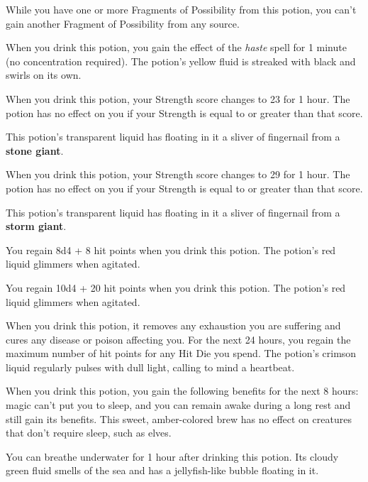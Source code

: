 \documentclass[10pt,a4paper,twoside,bg=print,twocolumn,openany,nodeprecatedcode]{dndbook}
\begin{document}
While you have one or more Fragments of Possibility from this potion, you can't gain another Fragment of Possibility from any source.

When you drink this potion, you gain the effect of the \textit{haste} spell for 1 minute (no concentration required). The potion's yellow fluid is streaked with black and swirls on its own.

When you drink this potion, your Strength score changes to 23 for 1 hour. The potion has no effect on you if your Strength is equal to or greater than that score.

This potion's transparent liquid has floating in it a sliver of fingernail from a \textbf{stone giant}.

When you drink this potion, your Strength score changes to 29 for 1 hour. The potion has no effect on you if your Strength is equal to or greater than that score.

This potion's transparent liquid has floating in it a sliver of fingernail from a \textbf{storm giant}.

You regain 8d4 + 8 hit points when you drink this potion. The potion's red liquid glimmers when agitated.

You regain 10d4 + 20 hit points when you drink this potion. The potion's red liquid glimmers when agitated.

When you drink this potion, it removes any exhaustion you are suffering and cures any disease or poison affecting you. For the next 24 hours, you regain the maximum number of hit points for any Hit Die you spend. The potion's crimson liquid regularly pulses with dull light, calling to mind a heartbeat.

When you drink this potion, you gain the following benefits for the next 8 hours: magic can't put you to sleep, and you can remain awake during a long rest and still gain its benefits. This sweet, amber-colored brew has no effect on creatures that don't require sleep, such as elves.

You can breathe underwater for 1 hour after drinking this potion. Its cloudy green fluid smells of the sea and has a jellyfish-like bubble floating in it.
\end{document}

